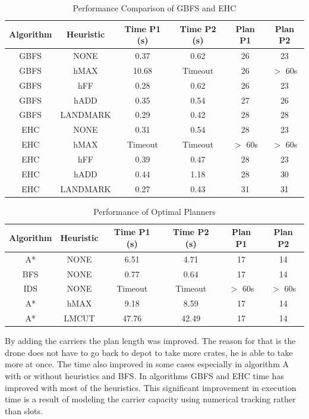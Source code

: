 \documentclass{article}
\begin{document}
\begin{table}[H]
\centering
\begin{tabular}{|c|c|c|c|c|c|}
\hline
\textbf{Algorithm} & \textbf{Heuristic} & \textbf{Time P1 (s)} & \textbf{Time P2 (s)} & \textbf{Plan P1} & \textbf{Plan P2} \\ \hline
GBFS & NONE & 0.37 & 0.62 & 26 & 23 \\ \hline
GBFS & hMAX & 10.68 & Timeout & 26 & $>$ 60s \\ \hline
GBFS & hFF & 0.28 & 0.62 & 26 & 23 \\ \hline
GBFS & hADD & 0.35 & 0.54 & 27 & 26 \\ \hline
GBFS & LANDMARK & 0.29 & 0.42 & 28 & 28 \\ \hline
EHC & NONE & 0.31 & 0.54 & 28 & 23 \\ \hline
EHC & hMAX & Timeout & Timeout & $>$ 60s & $>$ 60s \\ \hline
EHC & hFF & 0.39 & 0.47 & 28 & 23 \\ \hline
EHC & hADD & 0.44 & 1.18 & 28 & 30 \\ \hline
EHC & LANDMARK & 0.27 & 0.43 & 31 & 31 \\ \hline
\end{tabular}
\caption{Performance Comparison of GBFS and EHC}
\label{tab:results_2_1_gbfs_ehc}
\end{table}


\begin{table}[H]
\centering
\begin{tabular}{|c|c|c|c|c|c|}
\hline
\textbf{Algorithm} & \textbf{Heuristic} & \textbf{Time P1 (s)} & \textbf{Time P2 (s)} & \textbf{Plan P1} & \textbf{Plan P2} \\ \hline
A* & NONE & 6.51 & 4.71 & 17 & 14 \\ \hline
BFS & NONE & 0.77 & 0.64 & 17 & 14 \\ \hline
IDS & NONE & Timeout & Timeout & $>$ 60s & $>$ 60s \\ \hline
A* & hMAX & 9.18 & 8.59 & 17 & 14 \\ \hline
A* & LMCUT & 47.76 & 42.49 & 17 & 14 \\ \hline
\end{tabular}
\caption{Performance of Optimal Planners}
\label{tab:results_2_1_optimal}
\end{table}

By adding the carriers the plan length was improved. The reason for that is the drone does not have to go back to depot to take more crates, he is able to take more at once. The time also improved in some cases especially in algorithm A with or without heuristics and BFS. In algorithms GBFS and EHC time has improved with most of the heuristics. This significant improvement in execution time is a result of modeling the carrier capacity using numerical tracking rather than slots. 
\end{document}
